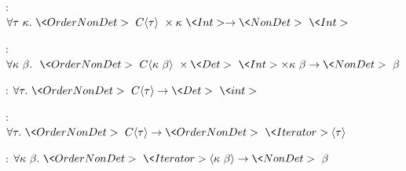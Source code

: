 \begin{figure}


    : 
    $
    \forallt{\tau\ \kappa}
    \<OrderNonDet> \ C \angles{\tau} \ \times \kappa \ \<Int> \rightarrow 
    \<NonDet> \ \<Int>
    $
    
    \bigskip
    
    : 
    $
    \forallt{\kappa\ \beta} \ \<OrderNonDet> \ C \angles{\kappa \ \beta} \ \times \<Det> \ \<Int> \times \kappa \ \beta \rightarrow 
    \<NonDet> \ \beta
    $
    
    \bigskip
    
    
    :
    $
    \forallt{\tau} \<OrderNonDet>\ C\angles{\tau} \rightarrow
    \<Det> \ \<int>
    $
   

    \bigskip

    : 
    $
    \forallt{\tau} \<OrderNonDet> \ C \angles{\tau} \rightarrow 
    \<OrderNonDet> \ \<Iterator> \angles{\tau}
    $
    
    \bigskip
    

    :
    $
    \forallt{\kappa\ \beta} \<OrderNonDet>\ \<Iterator>\angles{\kappa \ \beta} \rightarrow
    \<NonDet>\ \beta
    $
    
    \bigskip
    


\end{figure}

